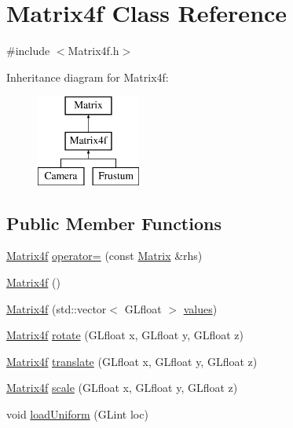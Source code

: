 \hypertarget{class_matrix4f}{
\section{\-Matrix4f \-Class \-Reference}
\label{class_matrix4f}
}


{\ttfamily \#include $<$\-Matrix4f.\-h$>$}

\-Inheritance diagram for \-Matrix4f\-:\begin{figure}[H]
\begin{center}
\leavevmode
\includegraphics[height=3.000000cm]{class_matrix4f}
\end{center}
\end{figure}
\subsection*{\-Public \-Member \-Functions}
\begin{DoxyCompactItemize}
\item 
\hyperlink{class_matrix4f}{\-Matrix4f} \hyperlink{class_matrix4f_a8e06b155b8ee0414bf46103dc4d66856}{operator=} (const \hyperlink{class_matrix}{\-Matrix} \&rhs)
\item 
\hyperlink{class_matrix4f_a2aea81514a71d644a97d8d0b3971a858}{\-Matrix4f} ()
\item 
\hyperlink{class_matrix4f_ae52bef2ab502a173e03fdd6913a215e5}{\-Matrix4f} (std\-::vector$<$ \-G\-Lfloat $>$ \hyperlink{class_matrix_a7b0bacf179e0b5ac7d5e74b7eff9e353}{values})
\item 
\hyperlink{class_matrix4f}{\-Matrix4f} \hyperlink{class_matrix4f_ab5601849252dfee2b0a3475b1620b545}{rotate} (\-G\-Lfloat x, \-G\-Lfloat y, \-G\-Lfloat z)
\item 
\hyperlink{class_matrix4f}{\-Matrix4f} \hyperlink{class_matrix4f_a63e0c8b1c4a13bb98de2b85af70b300b}{translate} (\-G\-Lfloat x, \-G\-Lfloat y, \-G\-Lfloat z)
\item 
\hyperlink{class_matrix4f}{\-Matrix4f} \hyperlink{class_matrix4f_aa6b9fbf059fef2d6807a14940f8c2915}{scale} (\-G\-Lfloat x, \-G\-Lfloat y, \-G\-Lfloat z)
\item 
void \hyperlink{class_matrix4f_ac76d8eddcf58efbcb08148c883717498}{load\-Uniform} (\-G\-Lint loc)
\end{DoxyCompactItemize}


